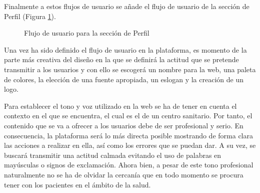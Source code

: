 Finalmente a estos flujos de usuario se añade el flujo de usuario de la sección de Perfil (Figura \ref{flow-perfil}).

\begin{figure}[H]
    \caption{Flujo de usuario para la sección de Perfil}
    \label{flow-perfil}
\end{figure}


Una vez ha sido definido el flujo de usuario en la plataforma, es momento de la parte más creativa del diseño en la que se definirá la actitud que se pretende transmitir a los usuarios y con ello se escogerá un nombre para la web, una paleta de colores, la elección de una fuente apropiada, un eslogan y la creación de un logo. \bigskip

Para establecer el tono y voz utilizado en la web se ha de tener en cuenta el contexto en el que se encuentra, el cual es el de un centro sanitario. Por tanto, el contenido que se va a ofrecer a los usuarios debe de ser profesional y serio. En consecuencia, la plataforma será lo más directa posible mostrando de forma clara las acciones a realizar en ella, así como los errores que se puedan dar. A su vez, se buscará transmitir una actitud calmada evitando el uso de palabras en mayúsculas o signos de exclamación. Ahora bien, a pesar de este tono profesional naturalmente no se ha de olvidar la cercanía que en todo momento se procura tener con los pacientes en el ámbito de la salud.\bigskip

